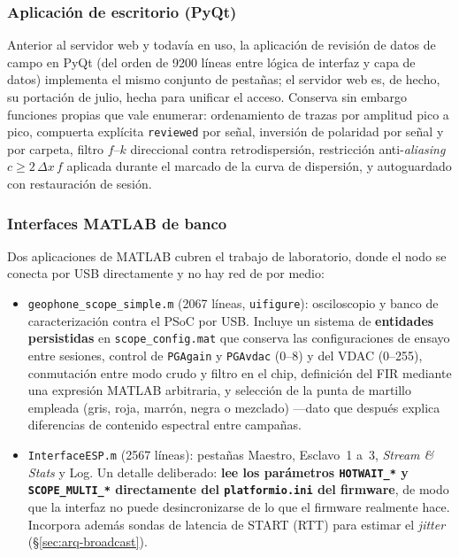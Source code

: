 \subsubsection{Aplicaci\'on de escritorio (PyQt)}

Anterior al servidor web y todav\'ia en uso, la aplicaci\'on de revisi\'on de datos de
campo en PyQt (del orden de \num{9200} l\'ineas entre l\'ogica de interfaz y capa de
datos) implementa el mismo conjunto de pesta\~nas; el servidor web es, de hecho, su
portaci\'on de julio, hecha para unificar el acceso. Conserva sin embargo funciones
propias que vale enumerar: ordenamiento de trazas por amplitud pico a pico, compuerta
expl\'icita \texttt{reviewed} por se\~nal, inversi\'on de polaridad por se\~nal y por
carpeta, filtro $f$--$k$ direccional contra retrodispersi\'on, restricci\'on
anti-\emph{aliasing} $c\ge 2\,\Delta x\,f$ aplicada durante el marcado de la curva de
dispersi\'on, y autoguardado con restauraci\'on de sesi\'on.

\subsubsection{Interfaces MATLAB de banco}

Dos aplicaciones de MATLAB cubren el trabajo de laboratorio, donde el nodo se conecta por
USB directamente y no hay red de por medio:

\begin{itemize}[itemsep=0.2em]
    \item \texttt{geophone\_scope\_simple.m} (\num{2067} l\'ineas, \texttt{uifigure}):
    osciloscopio y banco de caracterizaci\'on contra el PSoC por USB. Incluye un sistema
    de \textbf{entidades persistidas} en \texttt{scope\_config.mat} que conserva las
    configuraciones de ensayo entre sesiones, control de \texttt{PGAgain} y
    \texttt{PGAvdac} (0--8) y del VDAC (0--255), conmutaci\'on entre modo crudo y filtro
    en el chip, definici\'on del FIR mediante una expresi\'on MATLAB arbitraria, y
    selecci\'on de la punta de martillo empleada (gris, roja, marr\'on, negra o mezclado)
    ---dato que despu\'es explica diferencias de contenido espectral entre campa\~nas.
    \item \texttt{InterfaceESP.m} (\num{2567} l\'ineas): pesta\~nas Maestro, Esclavo~1 a~3,
    \emph{Stream \& Stats} y Log. Un detalle deliberado: \textbf{lee los par\'ametros
    \texttt{HOTWAIT\_*} y \texttt{SCOPE\_MULTI\_*} directamente del
    \texttt{platformio.ini} del firmware}, de modo que la interfaz no puede
    desincronizarse de lo que el firmware realmente hace. Incorpora adem\'as sondas de
    latencia de START (RTT) para estimar el \emph{jitter}
    (\S\ref{sec:arq-broadcast}).
\end{itemize}

